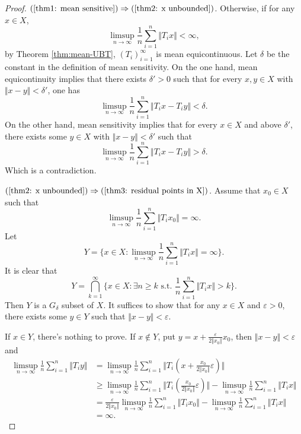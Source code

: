 \documentclass[12pt,a4paper]{amsart}
\theoremstyle{definition}
\theoremstyle{plain}
\begin{document}
\begin{proof}
     $(\ref{thm1: mean sensitive}) \Rightarrow (\ref{thm2: x unbounded})$. 
    Otherwise, if for any $x\in X$,
    $$\limsup_{n\to \infty} \frac{1}{n} \sum_{i=1}^{n} \Vert T_ix\Vert<\infty,$$
    by Theorem \ref{thm:mean-UBT}, $(T_i)_{i=1}^{\infty}$ is mean equicontinuous. 
    Let $\delta$ be the constant in the definition of mean sensitivity.
    On the one hand, mean equicontinuity implies that there exists $\delta'>0$
    such that for every $x,y\in X$ with $\Vert x-y\Vert<\delta'$, one has
    \[
        \limsup_{n\to \infty} \frac{1}{n} \sum_{i=1}^{n} \Vert T_ix -T_iy\Vert <\delta.
    \]
    On the other hand, mean sensitivity implies that for every $x\in X$ and above $\delta'$,
    there exists some $y\in X$ with $\Vert x-y\Vert <\delta'$ such that
    \[
        \limsup_{n\to \infty} \frac{1}{n} \sum_{i=1}^{n} \Vert T_ix -T_iy\Vert >\delta.
    \]
    Which is a contradiction.
    
     $(\ref{thm2: x unbounded})  \Rightarrow (\ref{thm3: residual points in X})$. 
    Assume that $x_0\in X$ such that
    $$\limsup_{n\to \infty} \frac{1}{n}
        \sum_{i=1}^{n} \Vert T_ix_0\Vert=\infty.$$
    Let \[
        Y=\biggl\{ x\in X\colon \limsup_{n\to{\infty}}\frac{1}{n}\sum_{i=1}^{n}\Vert T_i x\Vert=\infty \biggr \}.
    \]
    It is clear that
    \[
        Y =\bigcap_{k=1}^\infty \biggl\{ x\in X\colon \exists n\geq k \text{ s.t. }
        \frac{1}{n}\sum_{i=1}^{n}\Vert T_i x\Vert >k\biggr\}.\]
    Then $Y$ is a $G_\delta$ subset of $X$.
    It suffices to show that for any $x\in X$ and $\varepsilon>0$, there exists some $y\in Y$ such that
    $\Vert x-y \Vert <\varepsilon$.
     
    If $x\in Y$, there's nothing to prove.
    If $x\notin Y$, put $y=x+\frac{\varepsilon}{2\Vert x_0\Vert}x_0 $,
    then $\Vert x-y \Vert <\varepsilon$
    and
    \begin{align*}
        \limsup_{n\to \infty} \frac{1}{n} \sum_{i=1}^n
        \Vert T_iy\Vert & =
        \limsup_{n\to \infty} \frac{1}{n} \sum_{i=1}^n \Vert T_i(x+\tfrac{x_0}{2\Vert x_0\Vert } \varepsilon )\Vert  \\
        & \ge \limsup_{n\to \infty} \frac{1}{n} \sum_{i=1}^n \Vert T_i( \tfrac{x_0}{2\Vert x_0\Vert } \varepsilon )\Vert -\limsup_{n\to \infty} \frac{1}{n} \sum_{i=1}^n \Vert T_i x \Vert \\
        & =\frac{ \varepsilon}{2\Vert x_0\Vert }  \limsup_{n\to \infty} \frac{1}{n} \sum_{i=1}^n \Vert T_i x_0  \Vert -\limsup_{n\to \infty} \frac{1}{n} \sum_{i=1}^n \Vert T_i x \Vert    \\
         & =\infty.
    \end{align*}


\end{proof}
\end{document}
